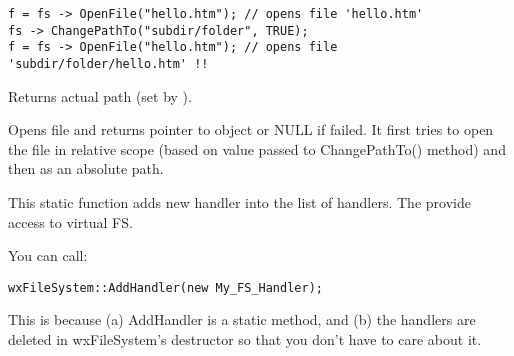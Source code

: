 \begin{verbatim}
f = fs -> OpenFile("hello.htm"); // opens file 'hello.htm'
fs -> ChangePathTo("subdir/folder", TRUE);
f = fs -> OpenFile("hello.htm"); // opens file 'subdir/folder/hello.htm' !!
\end{verbatim}

\label{wxfilesystemgetpath}


Returns actual path (set by ).

\label{wxfilesystemopenfile}


Opens file and returns pointer to  object
or NULL if failed. It first tries to open the file in relative scope
(based on value passed to ChangePathTo() method) and then as an
absolute path.

\label{wxfilesystemaddhandler}


This static function adds new handler into the list of handlers.
The  provide access to virtual FS.


You can call:

\begin{verbatim}
wxFileSystem::AddHandler(new My_FS_Handler);
\end{verbatim}

This is because (a) AddHandler is a static method, and (b) the handlers
are deleted in wxFileSystem's destructor so that you don't have to
care about it.

